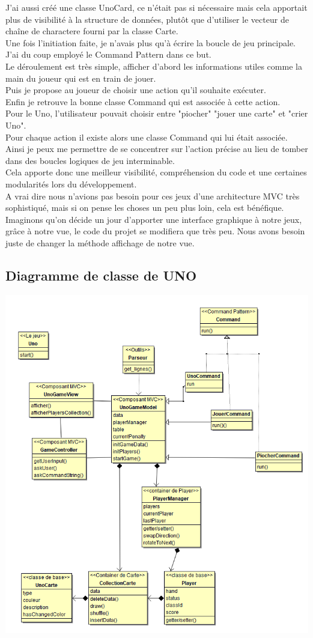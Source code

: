 \documentclass[12pt, letterpaper]{article}
\begin{document}
J’ai aussi créé une classe UnoCard, ce n’était pas si nécessaire mais cela apportait plus de visibilité à la structure de données,
plutôt que d’utiliser le vecteur de chaîne de charactere fourni par la classe Carte.\\
Une fois l’initiation faite, je n’avais plus qu’à écrire la boucle de jeu principale. J’ai du coup employé le Command Pattern dans ce but.\\
Le déroulement est très simple, afficher d’abord les informations utiles comme la main du joueur qui est en train de jouer.\\
Puis je propose au joueur de choisir une action qu’il souhaite exécuter.\\
Enfin je retrouve la bonne classe Command qui est associée à cette action.\\
Pour le Uno, l’utilisateur pouvait choisir entre "piocher" "jouer une carte" et "crier Uno".\\
Pour chaque action il existe alors une classe Command qui lui était associée.\\
Ainsi je peux me permettre de se concentrer sur l’action précise au lieu de tomber dans des boucles logiques de jeu interminable.\\
Cela apporte donc une meilleur visibilité, compréhension du code et une certaines modularités lors du développement.\\

A vrai dire nous n’avions pas besoin pour ces jeux d’une architecture MVC très sophistiqué, mais si on pense les choses un peu plus loin, cela est bénéfique. 
Imaginons qu’on décide un jour d’apporter une interface graphique à notre jeux, grâce à notre vue, le code du projet se modifiera que très peu. 
Nous avons besoin juste de changer la méthode affichage de notre vue.\\

\subsection{Diagramme de classe de UNO}

\includegraphics[width=\linewidth]{uno.PNG}
 
\end{document}
